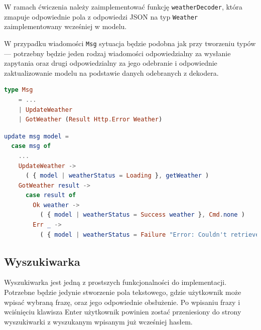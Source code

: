 \documentclass[twoside,a4paper]{report}
\begin{document}
W ramach ćwiczenia należy zaimplementować funkcję \texttt{weatherDecoder}, która zmapuje odpowiednie pola z odpowiedzi JSON na typ \texttt{Weather} zaimplementowany wcześniej w modelu.

W przypadku wiadomości \texttt{Msg} sytuacja będzie podobna jak przy tworzeniu typów --- potrzebny będzie jeden rodzaj wiadomości odpowiedzialny za wysłanie zapytania oraz drugi odpowiedzialny za jego odebranie i odpowiednie zaktualizowanie modelu na podstawie danych odebranych z dekodera.

\begin{lstlisting}[language=Elm]
type Msg
    = ...
    | UpdateWeather
    | GotWeather (Result Http.Error Weather)
\end{lstlisting}

\begin{lstlisting}[language=Elm]
update msg model =
  case msg of
    ...
    UpdateWeather ->
      ( { model | weatherStatus = Loading }, getWeather )
    GotWeather result ->
      case result of
        Ok weather ->
          ( { model | weatherStatus = Success weather }, Cmd.none )
        Err _ ->
          ( { model | weatherStatus = Failure "Error: Couldn't retrieve weather data" }, Cmd.none)
\end{lstlisting}



\subsection*{Wyszukiwarka}
Wyszukiwarka jest jedną z prostszych funkcjonalności do implementacji.
Potrzebne będzie jedynie stworzenie pola tekstowego, gdzie użytkownik może wpisać wybraną frazę, oraz jego odpowiednie obsłużenie.
Po wpisaniu frazy i wciśnięciu klawisza Enter użytkownik powinien zostać przeniesiony do strony wyszukiwarki z wyszukanym wpisanym już wcześniej hasłem.
\end{document}
